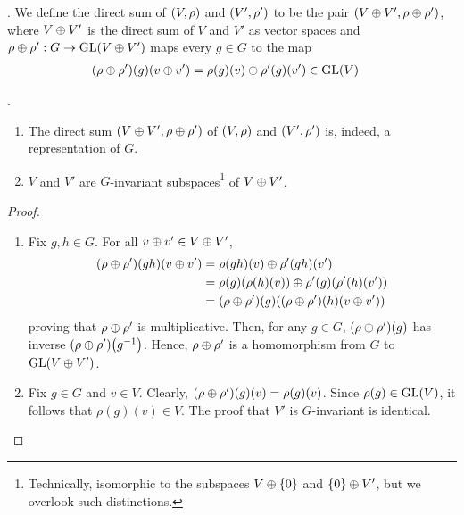 \begin{boxdefinition}
    . We define the direct sum of $\left( V,\rho \right)$ and $\left( V', \rho' \right)$ to be the pair $\left( V \oplus V', \rho \oplus \rho' \right)$, where $V \oplus V'$ is the direct sum of $V$ and $V'$ as vector spaces and $\rho \oplus \rho' : G \to \operatorname{GL}\!\left( V \oplus V' \right)$ maps every $g \in G$ to the map
    \begin{align*}
        \left( \rho \oplus \rho' \right)\!\left( g \right)\!\left( v \oplus v' \right) &= \rho(g)(v) \oplus \rho'(g)(v') \in \operatorname{GL}\!\left( V \right)
    \end{align*}
\end{boxdefinition}
\begin{proposition}
    .
    \begin{enumerate}[label = \normalfont \arabic*., noitemsep]
        \item The direct sum $\left( V \oplus V', \rho \oplus \rho' \right)$ of $\left( V,\rho \right)$ and $\left( V', \rho' \right)$ is, indeed, a representation of $G$.
        \item $V$ and $V'$ are $G$-invariant subspaces\footnote{Technically, isomorphic to the subspaces $V \oplus \left\{ 0 \right\}$ and $\left\{ 0 \right\} \oplus V'$, but we overlook such distinctions.} of $V \oplus V'$.
    \end{enumerate}
\end{proposition}
\begin{proof}
    \hfill
    \begin{enumerate}[noitemsep]
        \item Fix $g,h \in G$. For all $v \oplus v' \in V \oplus V'$,
        \begin{align*}
            \left( \rho \oplus \rho' \right)\!(gh)(v \oplus v') &= \rho(gh)(v) \oplus \rho'(gh)(v') \\
            &= \rho(g)\!\left( \rho(h)(v) \right) \oplus \rho'(g)\!\left( \rho'(h)(v') \right) \\
            &= \left( \rho \oplus \rho' \right)\!(g)\!\left( \left( \rho \oplus \rho' \right)\!(h)(v \oplus v') \right)
        \end{align*}
        proving that $\rho \oplus \rho'$ is multiplicative. Then, for any $g \in G$, $\left( \rho \oplus \rho' \right)\!(g)$ has inverse $\left( \rho \oplus \rho' \right)\!\left( g^{-1} \right)$. Hence, $\rho \oplus \rho'$ is a homomorphism from $G$ to $\operatorname{GL}\!\left( V \oplus V' \right)$.

        \item Fix $g \in G$ and $v \in V$. Clearly, $\left( \rho \oplus \rho' \right)\!(g)(v) = \rho(g)(v)$. Since $\rho(g) \in \operatorname{GL}\!\left( V \right)$, it follows that $\rho(g)(v) \in V$. The proof that $V'$ is $G$-invariant is identical.
    \end{enumerate}
    \vspace{-1em}
\end{proof}

